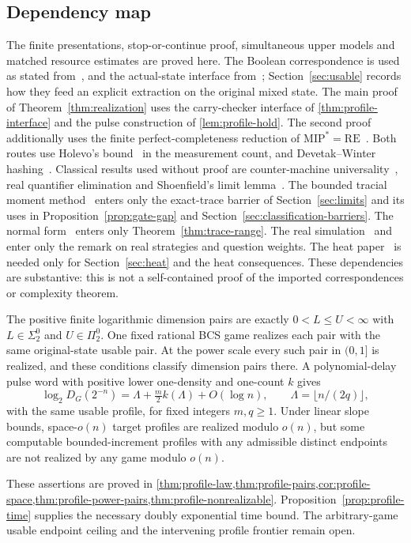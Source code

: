 \subsection{Dependency map}
The finite presentations, stop-or-continue proof, simultaneous upper models and matched resource estimates are proved here. The Boolean correspondence is used as stated from~\cite[Theorem~4.9]{DM-precision}, and the actual-state interface from~\cite[Proposition~6.1]{DM-precision}; Section~\ref{sec:usable} records how they feed an explicit extraction on the original mixed state. The main proof of Theorem~\ref{thm:realization} uses the carry-checker interface of \cref{thm:profile-interface} and the pulse construction of \cref{lem:profile-hold}. The second proof additionally uses the finite perfect-completeness reduction of $\mathrm{MIP}^*=\mathrm{RE}$~\cite[Theorem~12.6]{JNVWY}. Both routes use Holevo's bound~\cite{Hol73} in the measurement count, and Devetak--Winter hashing~\cite{DW05}. Classical results used without proof are counter-machine universality~\cite{SS63}, real quantifier elimination and Shoenfield's limit lemma~\cite{Sho59}. The bounded tracial moment method~\cite{BK12,KMV22} enters only the exact-trace barrier of Section~\ref{sec:limits} and its uses in Proposition~\ref{prop:gate-gap} and Section~\ref{sec:classification-barriers}. The normal form~\cite[Theorem~5.1]{DJS13} enters only Theorem~\ref{thm:trace-range}. The real simulation~\cite{MMG09} and~\cite[Lemma~11.12]{DM-precision} enter only the remark on real strategies and question weights. The heat paper~\cite{DM-heat} is needed only for Section~\ref{sec:heat} and the heat consequences. These dependencies are substantive: this is not a self-contained proof of the imported correspondences or complexity theorem.


\begin{fronttheorem}
The positive finite logarithmic dimension pairs are exactly $0<L\le U<\infty$ with $L\in\Sigma^0_2$ and $U\in\Pi^0_2$. One fixed rational BCS game realizes each pair with the same original-state usable pair. At the power scale every such pair in $(0,1]$ is realized, and these conditions classify dimension pairs there. A polynomial-delay pulse word with positive lower one-density and one-count $k$ gives
\[
 \log_2D_G(2^{-n})=\Lambda+\tfrac m2k(\Lambda)+O(\log n),
 \qquad\Lambda=\lfloor n/(2q)\rfloor,
\]
with the same usable profile, for fixed integers $m,q\ge1$. Under linear slope bounds, space-$o(n)$ target profiles are realized modulo $o(n)$, but some computable bounded-increment profiles with any admissible distinct endpoints are not realized by any game modulo $o(n)$.
\end{fronttheorem}
\noindent These assertions are proved in \cref{thm:profile-law,thm:profile-pairs,cor:profile-space,thm:profile-power-pairs,thm:profile-nonrealizable}. Proposition~\ref{prop:profile-time} supplies the necessary doubly exponential time bound. The arbitrary-game usable endpoint ceiling and the intervening profile frontier remain open.

